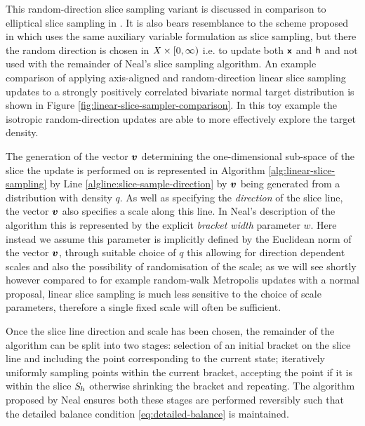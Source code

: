 This random-direction slice sampling variant is discussed in comparison to elliptical slice sampling in \citep{murray2010elliptical}. It is also bears resemblance to the scheme proposed in \citep{chen1998toward} which uses the same auxiliary variable formulation as slice sampling, but there the random direction is chosen in $\mathit{X}\times[0,\infty)$ i.e. to update both $\boldsymbol{\mathsf{x}}$ and $\mathsf{h}$ and not used with the remainder of Neal's slice sampling algorithm. An example comparison of applying axis-aligned and random-direction linear slice sampling updates to a strongly positively correlated bivariate normal target distribution is shown in Figure \ref{fig:linear-slice-sampler-comparison}. In this toy example the isotropic random-direction updates are able to more effectively explore the target density.

The generation of the vector $\boldsymbol{v}$ determining the one-dimensional sub-space of the slice the update is performed on is represented in Algorithm \ref{alg:linear-slice-sampling} by Line \ref{algline:slice-sample-direction} by $\boldsymbol{v}$ being generated from a distribution with density $q$. As well as specifying the \emph{direction} of the slice line, the vector $\boldsymbol{v}$ also specifies a scale along this line. In Neal's description of the algorithm this is represented by the explicit \emph{bracket width} parameter $w$. Here instead we assume this parameter is implicitly defined by the Euclidean norm of the vector $\boldsymbol{v}$, through suitable choice of $q$ this allowing for direction dependent scales and also the possibility of randomisation of the scale; as we will see shortly however compared to for example random-walk Metropolis updates with a normal proposal, linear slice sampling is much less sensitive to the choice of scale parameters, therefore a single fixed scale will often be sufficient.

Once the slice line direction and scale has been chosen, the remainder of the algorithm can be split into two stages: selection of an initial bracket on the slice line and including the point corresponding to the current state; iteratively uniformly sampling points within the current bracket, accepting the point if it is within the slice $\mathit{S}_h$ otherwise shrinking the bracket and repeating. The algorithm proposed by Neal ensures both these stages are performed reversibly such that the detailed balance condition \eqref{eq:detailed-balance} is maintained.

